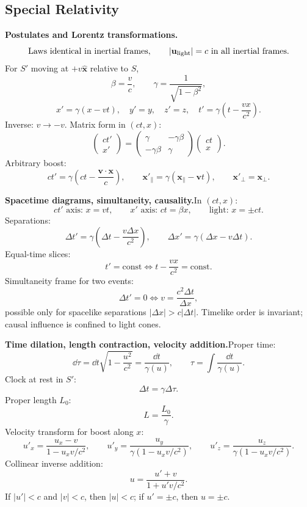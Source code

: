 \subsection{Special Relativity}

\noindent\textbf{Postulates and Lorentz transformations.}\quad
\[
  \text{Laws identical in inertial frames},\qquad
  |\mathbf u_{\rm light}|=c\ \text{in all inertial frames}.
\]
For $S'$ moving at $+v\hat{\mathbf x}$ relative to $S$,
\[
  \beta=\frac{v}{c},\qquad
  \gamma=\frac{1}{\sqrt{1-\beta^2}},
\]
\[
  \boxed{x'=\gamma(x-vt),\quad y'=y,\quad z'=z,\quad
  t'=\gamma\left(t-\frac{vx}{c^2}\right)}.
\]
Inverse: $v\to -v$. Matrix form in $(ct,x)$:
\[
  \begin{pmatrix}ct'\\x'\end{pmatrix}
  =
  \begin{pmatrix}\gamma&-\gamma\beta\\-\gamma\beta&\gamma\end{pmatrix}
  \begin{pmatrix}ct\\x\end{pmatrix}.
\]
Arbitrary boost:
\[
  ct'=\gamma\left(ct-\frac{\mathbf v\cdot\mathbf x}{c}\right),\qquad
  \mathbf x'_\parallel=\gamma(\mathbf x_\parallel-\mathbf v t),\qquad
  \mathbf x'_\perp=\mathbf x_\perp.
\]

\noindent\textbf{Spacetime diagrams, simultaneity, causality.}\quad In $(ct,x)$:
\[
  ct'\text{ axis: }x=vt,\qquad
  x'\text{ axis: }ct=\beta x,\qquad
  \text{light: }x=\pm ct.
\]
Separations:
\[
  \Delta t'=\gamma\left(\Delta t-\frac{v\Delta x}{c^2}\right),\qquad
  \Delta x'=\gamma(\Delta x-v\Delta t).
\]
Equal-time slices:
\[
  t'=\text{const}\Longleftrightarrow t-\frac{vx}{c^2}=\text{const}.
\]
Simultaneity frame for two events:
\[
  \Delta t'=0\Longleftrightarrow v=\frac{c^2\Delta t}{\Delta x},
\]
possible only for spacelike separations $|\Delta x|>c|\Delta t|$. Timelike order is
invariant; causal influence is confined to light cones. 

\noindent\textbf{Time dilation, length contraction, velocity addition.}\quad Proper
time:
\[
  \dd\tau=\dd t\sqrt{1-\frac{u^2}{c^2}}=\frac{\dd t}{\gamma(u)},\qquad
  \tau=\int\frac{\dd t}{\gamma(u)}.
\]
Clock at rest in $S'$:
\[
  \boxed{\Delta t=\gamma\Delta\tau}.
\]
Proper length $L_0$:
\[
  \boxed{L=\frac{L_0}{\gamma}}.
\]
Velocity transform for boost along $x$:
\[
  u'_x=\frac{u_x-v}{1-u_xv/c^2},\qquad
  u'_y=\frac{u_y}{\gamma(1-u_xv/c^2)},\qquad
  u'_z=\frac{u_z}{\gamma(1-u_xv/c^2)}.
\]
Collinear inverse addition:
\[
  \boxed{u=\frac{u'+v}{1+u'v/c^2}}.
\]
If $|u'|<c$ and $|v|<c$, then $|u|<c$; if $u'=\pm c$, then $u=\pm c$.

